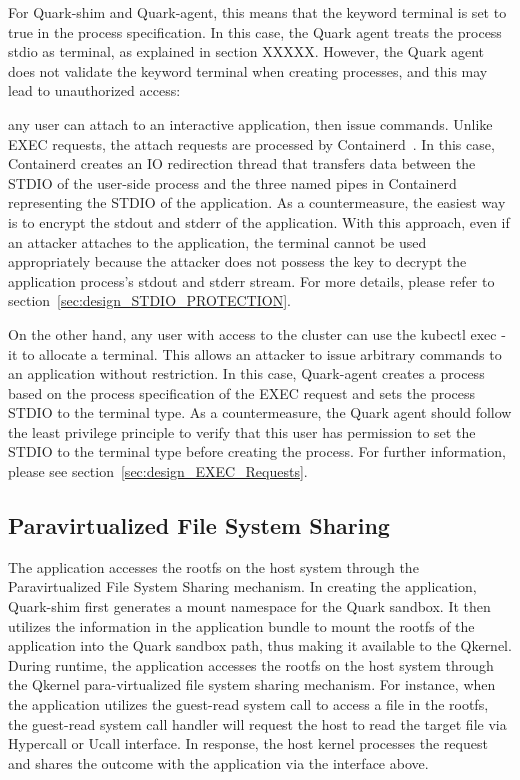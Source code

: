 For Quark-shim and Quark-agent, this means that the keyword terminal is set to true in the process specification. In this case, the Quark agent treats the process stdio as terminal, as explained in section XXXXX. However, the Quark agent does not 
validate the keyword terminal when creating processes, and this may lead to unauthorized access:

any user can attach to an interactive application, then issue commands. Unlike EXEC requests, the attach requests are processed by Containerd~\cite*{containerd}. In this case, Containerd creates an IO redirection thread that transfers data between 
the STDIO of the user-side process and the three named pipes in Containerd representing the STDIO of the application. As a countermeasure, the easiest way is to encrypt the stdout and stderr of the application. With this approach, even if an 
attacker attaches to the application, the terminal cannot be used appropriately because the attacker does not possess the key to decrypt the application process's stdout and stderr stream. For more details, please refer to section~\ref{sec:design_STDIO_PROTECTION}.


On the other hand, any user with access to the cluster can use the kubectl exec -it to allocate a terminal. This allows an attacker to issue arbitrary commands to an application without restriction. In this case, Quark-agent creates a process based 
on the process specification of the EXEC request and sets the process STDIO to the terminal type. As a countermeasure, the Quark agent should follow the least privilege principle to verify that this user has permission to set the STDIO to the 
terminal type before creating the process. For further information, please see section~\ref{sec:design_EXEC_Requests}.



\subsection{Paravirtualized File System Sharing}

The application accesses the rootfs on the host system through the Paravirtualized File System Sharing mechanism.   In creating the application, Quark-shim first generates a mount namespace for the Quark sandbox. It then utilizes the information in 
the application bundle to mount the rootfs of the application into the Quark sandbox path, thus making it available to the Qkernel. During runtime, the application accesses the rootfs on the host system through the Qkernel para-virtualized file 
system sharing mechanism. For instance, when the application utilizes the guest-read system call to access a file in the rootfs, the guest-read system call handler will request the host to read the target file via Hypercall or Ucall interface. 
In response, the host kernel processes the request and shares the outcome with the application via the interface above.


